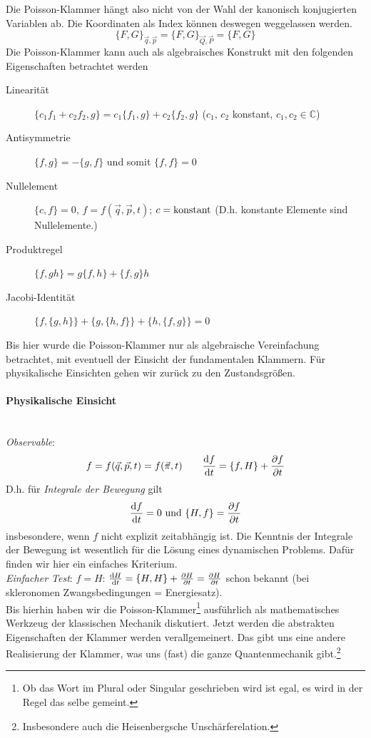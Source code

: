Die Poisson-Klammer hängt also nicht von der Wahl der kanonisch konjugierten Variablen ab. Die Koordinaten als Index können deswegen weggelassen werden.
$$\{F, G\}_{\vec{q}, \vec{p}} = \{F, G\}_{\vec{Q}, \vec{P}} = \{F, G\}$$
Die Poisson-Klammer kann auch als algebraisches Konstrukt mit den folgenden Eigenschaften betrachtet werden 
\begin{description}
	\item[Linearität] $\{c_1 f_1 + c_2 f_2, g\} = c_1 \{f_1, g\} + c_2 \{f_2, g\}$ ($c_1$, $c_2$ konstant, $c_1, c_2 \in \mathbb{C}$)
	\item[Antisymmetrie] $\{f, g\} = - \{g, f\}$ und somit $\{f, f\} = 0$
	\item[Nullelement] $\{c, f\} = 0$, $f=f(\vec{q}, \vec{p}, t)$; $c = \text{konstant}$ (D.h. konstante Elemente sind Nullelemente.)
	\item[Produktregel] $\{f, g h\} = g \{f, h\} + \{f, g\} h$
	\item[Jacobi-Identität] $\{f, \{g, h\}\} + \{g, \{h, f\}\} + \{h, \{f, g\}\} = 0$
\end{description}

Bis hier wurde die Poisson-Klammer nur als algebraische Vereinfachung betrachtet, mit eventuell der Einsicht der fundamentalen Klammern. Für physikalische Einsichten gehen wir zurück zu den Zustandsgrößen.

\paragraph{Physikalische Einsicht}~\\
\textit{Observable}: 
$$f = f(\vec{q}, \vec{p}, t) = f(\vec{\pi}, t) \qquad \frac{\mathrm d f}{\mathrm d t} = \{f, H\} + \frac{\partial f}{\partial t}$$
D.h. für \textit{Integrale der Bewegung} gilt
$$\frac{\mathrm d f}{\mathrm d t} = 0 \text{ und } \{H, f\} = \frac{\partial f}{\partial t}$$
insbesondere, wenn $f$ nicht explizit zeitabhängig ist. Die Kenntnis der Integrale der Bewegung ist wesentlich für die Lösung eines dynamischen Problems. Dafür finden wir hier ein einfaches Kriterium.\\
\textit{Einfacher Test}: $f = H$: $\frac{\mathrm d H}{\mathrm d t} = \{H, H\} + \frac{\partial H}{\partial t} = \frac{\partial H}{\partial t}$ schon bekannt (bei skleronomen Zwangsbedingungen = Energiesatz).\\
Bis hierhin haben wir die Poisson-Klammer\footnote{Ob das Wort im Plural oder Singular geschrieben wird ist egal, es wird in der Regel das selbe gemeint.} ausführlich als mathematisches Werkzeug der klassischen Mechanik diskutiert.
Jetzt werden die abstrakten Eigenschaften der Klammer werden verallgemeinert.
Das gibt uns eine andere Realisierung der Klammer, was uns (fast) die ganze Quantenmechanik gibt.\footnote{Insbesondere auch die Heisenbergsche Unschärferelation.}

